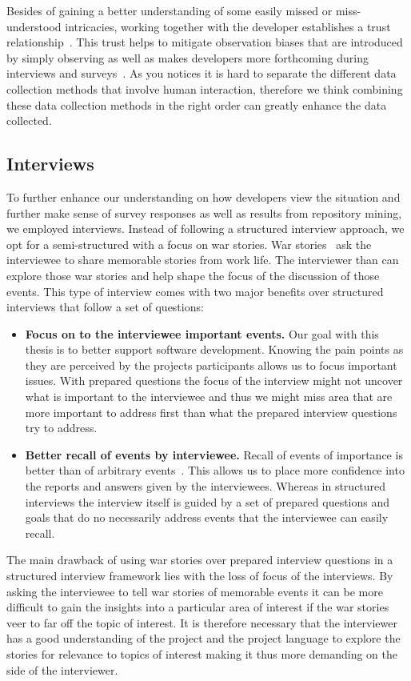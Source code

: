 Besides of gaining a better understanding of some easily missed or miss-understood intricacies, working together with the developer establishes a trust relationship~\cite{}.
This trust helps to mitigate observation biases that are introduced by simply observing as well as makes developers more forthcoming during interviews and surveys~\cite{}.
As you notices it is hard to separate the different data collection methods that involve human interaction, therefore we think combining these data collection methods in the right order can greatly enhance the data collected.


\subsection{Interviews}
To further enhance our understanding on how developers view the situation and further make sense of survey responses as well as results from repository mining, we employed interviews.
Instead of following a structured interview approach, we opt for a semi-structured with a focus on war stories.
War stories~\cite{lutters:ist:2007} ask the interviewee to share memorable stories from work life.
The interviewer than can explore those war stories and help shape the focus of the discussion of those events.
This type of interview comes with two major benefits over structured interviews that follow a set of questions:

\begin{itemize}
\item\textbf{Focus on to the interviewee important events.}
Our goal with this thesis is to better support software development.
Knowing the pain points as they are perceived by the projects participants allows us to focus important issues.
With prepared questions the focus of the interview might not uncover what is important to the interviewee and thus we might miss area that are more important to address first than what the prepared interview questions try to address.
\item\textbf{Better recall of events by interviewee.}
Recall of events of importance is better than of arbitrary events~\cite{}.
This allows us to place more confidence into the reports and answers given by the interviewees.
Whereas in structured interviews the interview itself is guided by a set of prepared questions and goals that do no necessarily address events that the interviewee can easily recall.
\end{itemize}

The main drawback of using war stories over prepared interview questions in a structured interview framework lies with the loss of focus of the interviews.
By asking the interviewee to tell war stories of memorable events it can be more difficult to gain the insights into a particular area of interest if the war stories veer to far off the topic of interest.
It is therefore necessary that the interviewer has a good understanding of the project and the project language to explore the stories for relevance to topics of interest making it thus more demanding on the side of the interviewer.

